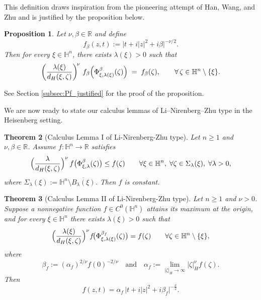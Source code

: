 \documentclass[reqno]{amsart}
\newtheorem{thm}{Theorem}[section]
\newtheorem{prop}[thm]{Proposition}
\theoremstyle{definition}
\theoremstyle{remark}
\numberwithin{equation}{section}
\begin{document}
This definition draws inspiration from the pioneering attempt of Han, Wang, and Zhu \cite{HWZ17} and is justified by the proposition below.

\begin{prop}\label{prop:justifydefn}
Let $\nu, \beta \in \mathbb{R}$ and define
\[
f_{\beta}(z,t) := \bigl| t + i|z|^{2} + i\beta \bigr|^{-\nu/2}.
\]
Then for every $\xi \in \mathbb{H}^{n}$, there exists $\lambda(\xi) > 0$ such that
\begin{equation}\label{eqn:funceqn}
\left(\frac{\lambda(\xi)}{d_{H}\!\left(\xi,\zeta\right)}\right)^{\!\nu} 
\, f_{\beta}\Bigl(\Phi_{\xi,\lambda(\xi)}^{\beta}(\zeta)\Bigr) 
\;=\; f_{\beta}(\zeta), \qquad \forall\, \zeta \in \mathbb{H}^{n}\setminus\{\xi\}.
\end{equation}
\end{prop}

See Section \ref{subsec:Pf_justified} for the proof of the proposition.

We are now ready to state our calculus lemmas of Li–Nirenberg–Zhu type in the Heisenberg setting.

\begin{thm}[Calculus Lemma I of Li-Nirenberg-Zhu type] \label{thm:lnzlem1}
Let \(n\ge 1\) and \(\nu,\beta\in\mathbb{R}\). Assume \(f:\mathbb{H}^n\to\mathbb{R}\) satisfies
\begin{equation}\label{eqn:lnzinq}
\Bigl(\frac{\lambda}{d_H(\xi,\zeta)}\Bigr)^{\nu}
\,f \bigl(\Phi_{\xi,\lambda}^{\beta}(\zeta)\bigr) \leq f(\zeta)
\qquad \forall \xi\in\mathbb{H}^n,\; \forall \zeta\in\Sigma_{\lambda}(\xi),\; \forall \lambda>0,
\end{equation}
where \(\Sigma_{\lambda}(\xi):=\mathbb{H}^n\setminus \overline{B_\lambda(\xi)}\). Then \(f\) is constant.
\end{thm}

\begin{thm}[Calculus Lemma II of Li-Nirenberg-Zhu type] \label{thm:lnzlem2}
Let \(n\ge 1\) and \(\nu>0\). Suppose a nonnegative function \(f\in C^0(\mathbb{H}^n)\) attains its maximum at the origin, and for every \(\xi\in\mathbb{H}^n\) there exists \(\lambda(\xi)>0\) such that
\[
\Bigl(\frac{\lambda(\xi)}{d_H(\xi,\zeta)}\Bigr)^{\nu}
f\!\bigl(\Phi_{\xi,\lambda(\xi)}^{\beta_f}(\zeta)\bigr)=f(\zeta)
\qquad \forall \zeta\in\mathbb{H}^n\setminus\{\xi\},
\]
where 
\begin{equation}\label{eqn:alphabeta}
\beta_f:=(\alpha_f)^{2/\nu}f(0)^{-2/\nu} \quad \text{and} \quad \alpha_f:=\lim_{|\zeta|_H\to\infty}|\zeta|_H^{\nu}f(\zeta).
\end{equation}
Then
\[
f(z,t) = \alpha_f\,\bigl| t + i|z|^2 + i\beta_f \bigr|^{-\frac{\nu}{2}}.
\]
\end{thm}
\end{document}
